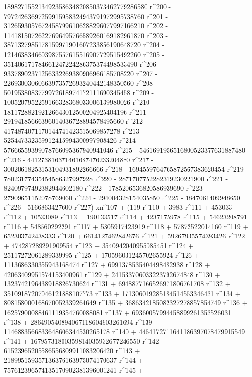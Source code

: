        189827155213492358634820850373462779286580 r^200 - 
       79724263697259915958324943791972995738760 r^201 - 
       31265930576724587996106288296077997166210 r^202 - 
       11418150726227696495766589260169182961870 r^203 - 
       3871327985178159971901607233856190648720 r^204 - 
       1214638346603987557615516907729515492260 r^205 - 
       351406171784661247224286375374498533490 r^206 - 
       93378902371256332269380906966185708220 r^207 - 
       22693003060663973572693240442148350560 r^208 - 
       5019538083779972618974172111690345458 r^209 - 
       1005207952259166328368033006139980026 r^210 - 
       181172882192126643012500204925404196 r^211 - 
       29194185666396014036728894578495660 r^212 - 
       4174874071170144741423515069857278 r^213 - 
       525447332359912415994300997908426 r^214 - 
       57666559399078766095367940941046 r^215 - 
       5461691956516800523377631887480 r^216 - 
       441273816371461687476233204880 r^217 - 
       30020618253153104931892266666 r^218 - 
       1694559764765872567383620454 r^219 - 
       78023177435454586327997928 r^220 - 
       2871707752282319230221900 r^221 - 
       82409797492382944602180 r^222 - 1785206536820586939690 r^223 - 
       27909651152078769060 r^224 - 294004328154035850 r^225 - 
       1847061409948650 r^226 - 
       5166863427600 r^227) xn^107 + (119 r^110 + 3983 r^111 + 
       453033 r^112 + 10533089 r^113 + 190133517 r^114 + 
       4237175978 r^115 + 54623208791 r^116 + 548560292291 r^117 + 
       5305917423919 r^118 + 57872522014160 r^119 + 
       652303742438333 r^120 + 6614127462842676 r^121 + 
       59267935574393426 r^122 + 474287289291909554 r^123 + 
       3540942040955085451 r^124 + 25117272061289339995 r^125 + 
       170596031245702655924 r^126 + 1113686330355943168474 r^127 + 
       6991378535404498482938 r^128 + 42063409951574153400961 r^129 + 
       241533706033223792674848 r^130 + 
       1323742196438918826730624 r^131 + 
       6948877166526971806761708 r^132 + 
       35109187207046121888107773 r^133 + 
       171306019285184514553346431 r^134 + 
       808158000168670052339264649 r^135 + 
       3686342185082327278857854749 r^136 + 
       16257900088461119354760088081 r^137 + 
       69360057994458899261353526031 r^138 + 
       286490540894067118604903261694 r^139 + 
       1146883566833648606344530265178 r^140 + 
       4454172711641186397078479915549 r^141 + 
       16795731800359814035932677246550 r^142 + 
       61523965205586556809911083206420 r^143 + 
       218995159357136376163975074170637 r^144 + 
       757612396574135170902381396001241 r^145 + 
